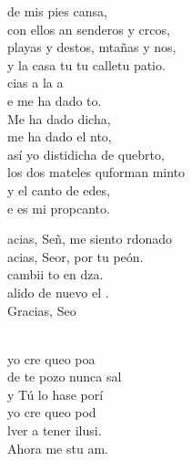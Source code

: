 \documentclass[12pt]{article}
\begin{document}
\begin{multicols*}{2}
\begin{cancion}
	de mis pies cansa,\\
	con ellos an senderos y crcos,\\
	playas y destos, mtañas y nos,\\
	y la casa tu tu calletu patio.\\
\jump
	cias a la a \\
	e me ha dado to.\\
	Me ha dado dicha, \\
	me ha dado el nto,\\
	así yo distidicha de quebrto,\\
	los dos mateles quforman minto\\
	y el canto de edes, \\
	e es mi propcanto.\\
\end{cancion}%

\begin{cancion}%
	\begin{chorus}%
	acias, Señ, me siento rdonado\\
	acias, Seor, por tu peón.\\
	cambii to en dza.\\
	alido de nuevo el .\\
	Gracias, Seo  \\
	\end{chorus}%
	\jump\\
	yo cre queo poa\\
	de te pozo nunca sal\\
	y Tú lo hase porí\\
\jump
	yo cre queo pod\\
	lver a tener ilusi.\\
	Ahora me stu am. \\
\end{cancion}%


\end{multicols*}
\end{document}

